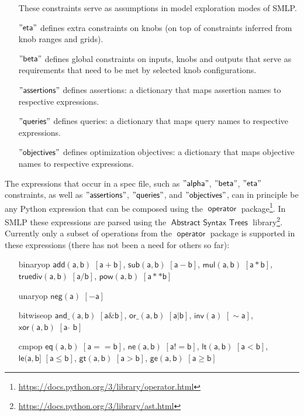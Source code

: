 \documentclass[a4paper,parskip=half]{article} %
\newcommand*\package[1]{\operatorname{\mathsf{#1}}} %
\newcommand*\speckey[1]{\operatorname{\mathsf{"{#1}"}}} %
\newcommand*\operator[1]{\operatorname{\mathsf{{#1}}}} %
\begin{document}
\begin{itemize}
These constraints serve as assumptions in model exploration modes of SMLP.
\item[$\speckey{eta}$] defines extra constraints on knobs
(on top of constraints inferred from knob ranges and grids).
\item[$\speckey{beta}$] defines global constraints on inputs, knobs and outputs
that serve as requirements that need to be met by selected knob configurations.
\item[$\speckey{assertions}$] defines assertions: a dictionary that maps assertion names to respective expressions. 
\item[$\speckey{queries}$] defines queries: a dictionary that maps query names to respective expressions.
\item[$\speckey{objectives}$] defines optimization objectives: a dictionary that maps objective names to respective expressions.
\end{itemize}


The expressions that occur in a spec file, such as $\speckey{alpha}$, $\speckey{beta}$, $\speckey{eta}$ constraints,
as well as $\speckey{assertions}$, $\speckey{queries}$, and $\speckey{objectives}$, can in principle be any Python expression
that can be composed using the $\package{operator}$ package\footnote{\url{https://docs.python.org/3/library/operator.html}}.
In SMLP these expressions are parsed using the 
$\package{Abstract\,\,Syntax\,\,Trees}$ library\footnote{\url{https://docs.python.org/3/library/ast.html}}.
Currently only a subset of operations from the $\package{operator}$ package is supported in these expressions 
(there has not been a need for others so far):
\begin{itemize}
\item[binaryop] $\operator{add(a,b)\,\,[a+b]}$, $\operator{sub(a,b)\,\,[a-b]}$, $\operator{mul(a,b)\,\,[a*b]}$, 
$\operator{truediv(a,b)\,\,[a/b]}$, $\operator{pow(a,b)\,\,[a**b]}$
\item[unaryop] $\operator{neg(a)\,\,[-a]}$
\item[bitwiseop] $\operator{and\_(a,b)\,\,[a\&b]}$, $\operator{or\_(a,b)\,\,[a|b]}$, $\operator{inv(a)\,\,[\sim a]}$, 
$\operator{xor(a,b)\,\,[a\,\,\hat{}\,\,b]}$
\item[cmpop] $\operator{eq(a,b)\,\,[a == b]}$, 
$\operator{ne(a,b)\,\,[a != b]}$, $\operator{lt(a,b)\,\,[a<b]}$, $\operator{le(a,b]\,\,[a\leq b]}$, $\operator{gt(a,b)\,\,[a>b]}$, 
$\operator{ge(a,b)\,\,[a\geq b]}$ 
\end{itemize}
\end{document}
